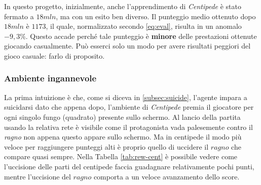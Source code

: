 \documentclass[twoside,twocolumn,10pt]{extarticle}
\theoremstyle{definition}
\begin{document}
		In questo progetto, inizialmente, anche l'apprendimento di \textit{Centipede} è stato fermato a $18mln$, ma con un esito ben diverso. Il punteggio medio ottenuto dopo $18mln$ è $1173$, il quale, normalizzato secondo \ref{eq:eval}, risulta in un anomalo $-9,3\%$. Questo accade perché tale punteggio è \textbf{minore} delle prestazioni ottenute giocando casualmente. Può esserci solo un modo per avere risultati peggiori del gioco casuale: farlo di proposito. 
		
		\subsubsection{Ambiente ingannevole}
			La prima intuizione è che, come si diceva in \ref{subsec:suicide}, l'agente impara a suicidarsi dato che appena dopo, l'ambiente di \textit{Centipede} premia il giocatore per ogni singolo fungo (quadrato) presente sullo schermo. Al lancio della partita usando la relativa rete è visibile come il protagonista vada palesemente contro il \textit{ragno} non appena questo appare sullo schermo. Ma in centipede il modo più veloce per raggiungere punteggi alti è proprio quello di uccidere il $ragno$ che compare quasi sempre. Nella Tabella \ref{tab:rew-cent} è possibile vedere come l'uccisione delle parti del centipede faccia guadagnare relativamente pochi punti, mentre l'uccisione del $ragno$ comporta a un veloce avanzamento dello score.
\end{document}
